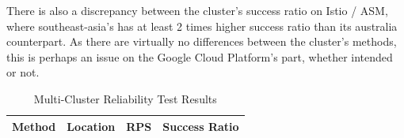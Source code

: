 There is also a discrepancy between the cluster's success ratio on Istio / ASM, where southeast-asia's has at least 2 times higher success ratio than its australia counterpart. As there are virtually no differences between the cluster's methods, this is perhaps an issue on the Google Cloud Platform's part, whether intended or not.


\begin{table}[h]
\centering
\caption{Multi-Cluster Reliability Test Results}

\begin{tabular}{|c|c|c|c|}
\hline


\textbf{Method} & \textbf{Location} & \textbf{RPS} & \textbf{Success Ratio} \\ \hline



\end{tabular}
\end{table}

